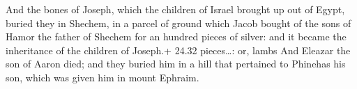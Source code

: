  And the bones of Joseph, which the children of Israel
brought up out of Egypt, buried they in Shechem, in a parcel of ground
which Jacob bought of the sons of Hamor the father of Shechem for an
hundred pieces of silver: and it became the inheritance of the children
of Joseph.+ 24.32 pieces\ldots: or, lambs  And Eleazar the
son of Aaron died; and they buried him in a hill that pertained to
Phinehas his son, which was given him in mount Ephraim.
